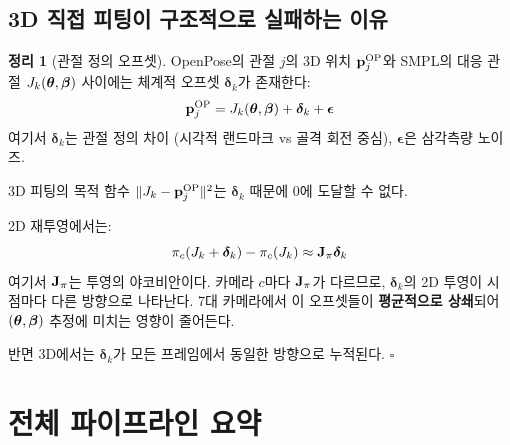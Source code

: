 \documentclass[11pt, a4paper]{report}
\theoremstyle{definition}
\newtheorem{theorem}{정리}[chapter]
\theoremstyle{remark}
\begin{document}
\section{3D 직접 피팅이 구조적으로 실패하는 이유}

\begin{theorem}[관절 정의 오프셋]
OpenPose의 관절 $j$의 3D 위치 $\mathbf{p}_j^{\text{OP}}$와
SMPL의 대응 관절 $J_k(\bm{\theta}, \bm{\beta})$ 사이에는 체계적 오프셋 $\bm{\delta}_k$가 존재한다:
\begin{equation}
\mathbf{p}_j^{\text{OP}} = J_k(\bm{\theta}, \bm{\beta}) + \bm{\delta}_k + \bm{\epsilon}
\end{equation}
여기서 $\bm{\delta}_k$는 관절 정의 차이 (시각적 랜드마크 vs 골격 회전 중심),
$\bm{\epsilon}$은 삼각측량 노이즈.

3D 피팅의 목적 함수 $\|J_k - \mathbf{p}_j^{\text{OP}}\|^2$는 $\bm{\delta}_k$ 때문에 0에 도달할 수 없다.
\end{theorem}

\begin{proofbox}[title={2D 재투영에서 오프셋이 희석되는 이유}]
2D 재투영에서는:
\begin{equation}
\pi_c(J_k + \bm{\delta}_k) - \pi_c(J_k) \approx \mathbf{J}_\pi \bm{\delta}_k
\end{equation}
여기서 $\mathbf{J}_\pi$는 투영의 야코비안이다.
카메라 $c$마다 $\mathbf{J}_\pi$가 다르므로, $\bm{\delta}_k$의 2D 투영이 시점마다 다른 방향으로 나타난다.
7대 카메라에서 이 오프셋들이 \textbf{평균적으로 상쇄}되어
$(\bm{\theta}, \bm{\beta})$ 추정에 미치는 영향이 줄어든다.

반면 3D에서는 $\bm{\delta}_k$가 모든 프레임에서 동일한 방향으로 누적된다. $\square$
\end{proofbox}


\chapter{전체 파이프라인 요약}
\label{ch:pipeline}
\end{document}
